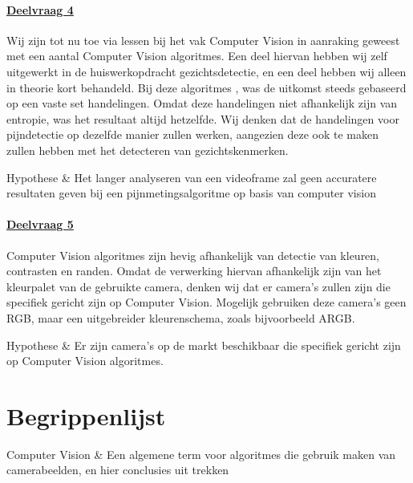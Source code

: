 \documentclass[11pt]{article}
\begin{document}
    \paragraph{\hyperref[itm:dv4]{Deelvraag 4}}
    Wij zijn tot nu toe via lessen bij het vak Computer Vision in aanraking geweest met een aantal Computer Vision algoritmes.
    Een deel hiervan hebben wij zelf uitgewerkt in de huiswerkopdracht gezichtsdetectie, en een deel hebben wij alleen in theorie kort behandeld.
    Bij deze algoritmes , was de uitkomst steeds gebaseerd op een vaste set handelingen.
    Omdat deze handelingen niet afhankelijk zijn van entropie, was het resultaat altijd hetzelfde.
    Wij denken dat de handelingen voor pijndetectie op dezelfde manier zullen werken, aangezien deze ook te maken zullen hebben met het detecteren van gezichtskenmerken.\\

    \begin{definition}
        Hypothese & Het langer analyseren van een videoframe zal geen accuratere resultaten geven bij een pijnmetingsalgoritme op basis van computer vision
    \end{definition}

    \paragraph{\hyperref[itm:dv5]{Deelvraag 5}}
    Computer Vision algoritmes zijn hevig afhankelijk van detectie van kleuren, contrasten en randen.
    Omdat de verwerking hiervan afhankelijk zijn van het kleurpalet van de gebruikte camera, denken wij dat er camera's zullen zijn die specifiek gericht zijn op Computer Vision.
    Mogelijk gebruiken deze camera's geen RGB, maar een uitgebreider kleurenschema, zoals bijvoorbeeld ARGB.\\

    \begin{definition}
        Hypothese & Er zijn camera's op de markt beschikbaar die specifiek gericht zijn op Computer Vision algoritmes.
    \end{definition}


    \section{Begrippenlijst}\label{sec:begrippenlijst}

    \begin{definition}
        Computer Vision & Een algemene term voor algoritmes die gebruik maken van camerabeelden, en hier conclusies uit trekken\\

    \end{definition}
\end{document}
